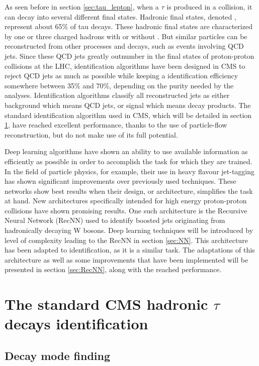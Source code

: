 
As seen before in section \ref{sec:tau_lepton}, when a $\tau$ is produced in a collision, it can decay into several different final states.
Hadronic final states, denoted \tauh, represent about 65\% of tau decays.
These hadronic final states are characterized by one or three charged hadrons with or without \pizero . But similar particles can be reconstructed from other processes and decays, such as events involving QCD jets.
Since these QCD jets greatly outnumber \tauh in the final states of proton-proton collisions at the LHC, \tauh identification algorithms have been designed in CMS to reject QCD jets as much as possible while keeping a \tauh identification efficiency somewhere between 35\% and 70\%, depending on the purity needed by the analyses. Identification algorithms classify all reconstructed jets as either background which means QCD jets, or signal which means \tauh decay products.
The standard \tauh identification algorithm used in CMS, which will be detailed in section \ref{sec:std_tau_id}, have reached excellent performance, thanks to the use of particle-flow reconstruction, but do not make use of its full potential. 

Deep learning algorithms have shown an ability to use available information as efficiently as possible in order to accomplish the task for which they are trained. In the field of particle physics, for example, their use in heavy flavour jet-tagging \cite{btagging_NN} has shown significant improvements over previously used techniques. These networks show best results when their design, or architecture, simplifies the task at hand. New architectures specifically intended for high energy proton-proton collisions have shown promising results. One such architecture is the Recursive Neural Network (RecNN) \cite{Louppe:2017ipp} used to identify boosted jets originating from hadronically decaying W bosons. Deep learning techniques will be introduced by level of complexity leading to the RecNN in section \ref{sec:NN}. This architecture has been adapted to \tauh identification, as it is a similar task. The adaptations of this architecture as well as some improvements that have been implemented will be presented in section \ref{sec:RecNN}, along with the reached performance.

\section{The standard CMS hadronic $\tau$ decays identification}
\label{sec:std_tau_id}
\subsection{Decay mode finding}

